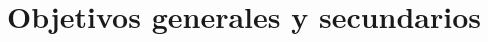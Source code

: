 \documentclass[../proyecto.tex]{subfiles}
\begin{document}
\chapter{Objetivos generales y secundarios}

\end{document}
